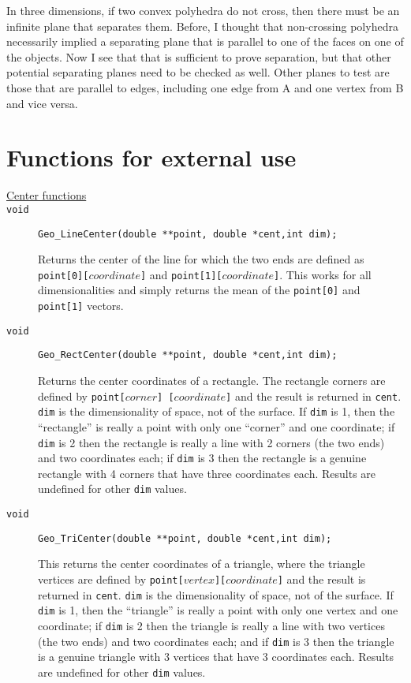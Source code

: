 \documentclass[11pt]{article}
\newcommand {\ttt} {\texttt}
\begin{document}
In three dimensions, if two convex polyhedra do not cross, then there must be an infinite plane that separates them.  Before, I thought that non-crossing polyhedra necessarily implied a separating plane that is parallel to one of the faces on one of the objects.  Now I see that that is sufficient to prove separation, but that other potential separating planes need to be checked as well.  Other planes to test are those that are parallel to edges, including one edge from A and one vertex from B and vice versa.



\section{Functions for external use}

\begin{description}

\item[\underline{Center functions}]

\item[\ttt{void}]
\ttt{Geo\_LineCenter(double **point, double *cent,int dim);}

Returns the center of the line for which the two ends are defined as \ttt{point[0][$coordinate$]} and \ttt{point[1][$coordinate$]}.  This works for all dimensionalities and simply returns the mean of the \ttt{point[0]} and \ttt{point[1]} vectors.

\item[\ttt{void}]
\ttt{Geo\_RectCenter(double **point, double *cent,int dim);}

Returns the center coordinates of a rectangle. The rectangle corners are defined by \ttt{point[$corner$] [$coordinate$]} and the result is returned in \ttt{cent}. \ttt{dim} is the dimensionality of space, not of the surface. If \ttt{dim} is 1, then the ``rectangle'' is really a point with only one ``corner'' and one coordinate; if \ttt{dim} is 2 then the rectangle is really a line with 2 corners (the two ends) and two coordinates each; if \ttt{dim} is 3 then the rectangle is a genuine rectangle with 4 corners that have three coordinates each. Results are undefined for other \ttt{dim} values.

\item[\ttt{void}]
\ttt{Geo\_TriCenter(double **point, double *cent,int dim);}

This returns the center coordinates of a triangle, where the triangle vertices are defined by \ttt{point[$vertex$][$coordinate$]} and the result is returned in \ttt{cent}. \ttt{dim} is the dimensionality of space, not of the surface. If \ttt{dim} is 1, then the ``triangle'' is really a point with only one vertex and one coordinate; if \ttt{dim} is 2 then the triangle is really a line with two vertices (the two ends) and two coordinates each; and if \ttt{dim} is 3 then the triangle is a genuine triangle with 3 vertices that have 3 coordinates each. Results are undefined for other \ttt{dim} values.


\end{description}
\end{document}
